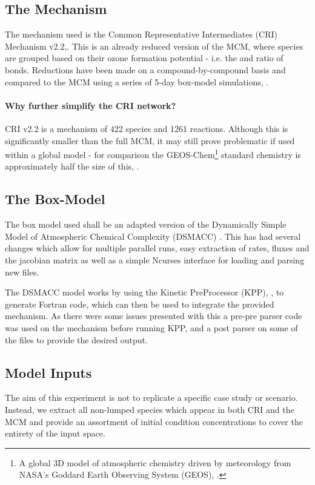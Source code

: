 \subsection{The Mechanism}
The mechanism used is the Common Representative Intermediates (CRI) Mechanism v2.2,\citep{criv2}. This is an already reduced version of the MCM, where species are grouped based on their ozone formation potential - i.e. the  and  ratio of bonds. 
Reductions have been made on a compound-by-compound basis and compared to the MCM using a series of 5-day box-model simulations, \citep{cri}. 

\paragraph*{Why further simplify the CRI network?}\label{sec:whycri}

CRI v2.2 is a mechanism of 422 species and 1261 reactions. Although this is significantly smaller than the full MCM, it may still prove problematic if used within a global model - for comparison the GEOS-Chem\footnote{A global 3D model of atmospheric chemistry driven by meteorology from NASA's Goddard Earth Observing System (GEOS), \citep{geos}.} standard chemistry is approximately half the size of this, \cite{geosgit}.

\subsection{The Box-Model}
The box model used shall be an adapted version of the Dynamically Simple Model of Atmospheric Chemical Complexity (DSMACC) \cite{dsmacc,dsmaccgit}. This has had several changes which allow for multiple parallel runs, easy extraction of rates, fluxes and the jacobian matrix as well as a simple Ncurses interface for loading and parsing new files. 

The DSMACC model works by using the Kinetic PreProcessor (KPP), \citep{kpp}, to generate Fortran code, which can then be used to integrate the provided mechanism. As there were some issues presented with this a pre-pre parser code was used on the mechanism before running KPP, and a post parser on some of the files to provide the desired output. 

\subsection{Model Inputs}
The aim of this experiment is not to replicate a specific case study or scenario. Instead, we extract all non-lumped species which appear in both CRI and the MCM and provide an assortment of initial condition concentrations to cover the entirety of the input space.

